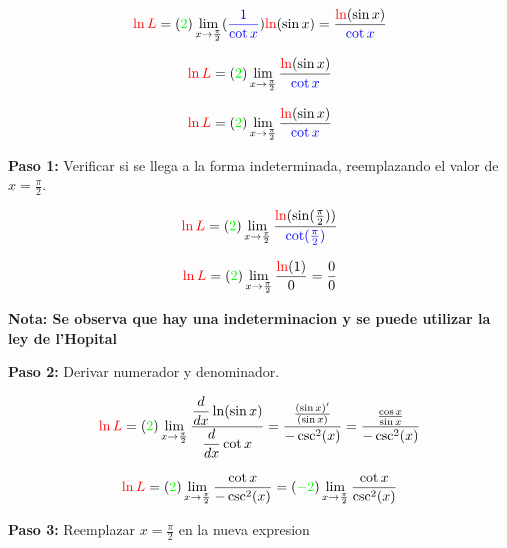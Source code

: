 \documentclass[12pt,a4paper]{article}
\begin{document}
\[
\textcolor{red}{\ln L} = (\textcolor{green}{2})\lim_{x \to  \frac{\pi}{2}} (\textcolor{blue}{\frac{1}{\cot x}}) \textcolor{red}{\ln}(\sin x)= \frac{\textcolor{red}{\ln}(\sin x)}{\textcolor{blue}{\cot x}}
\]

\[
\textcolor{red}{\ln L} = (\textcolor{green}{2})\lim_{x \to  \frac{\pi}{2}}\frac{\textcolor{red}{\ln}(\sin x)}{\textcolor{blue}{\cot x}}
\]




\[
\textcolor{red}{\ln L} = (\textcolor{green}{2})\lim_{x \to  \frac{\pi}{2}}\frac{\textcolor{red}{\ln}(\sin x)}{\textcolor{blue}{\cot x}} 
\]

\vspace{0.2cm}

\textbf{Paso 1:}
\vspace{0.2cm}
Verificar si se llega a la forma indeterminada, reemplazando el valor de $x= \frac{\pi}{2}$.


\[
\textcolor{red}{\ln L} = (\textcolor{green}{2})\lim_{x \to  \frac{\pi}{2}}\frac{\textcolor{red}{\ln}(\sin (\frac{\pi}{2}))}{\textcolor{blue}{\cot (\frac{\pi}{2})}}
\]

\[
\textcolor{red}{\ln L} = (\textcolor{green}{2})\lim_{x \to  \frac{\pi}{2}}\frac{\textcolor{red}{\ln}(1)}{0}= \frac{0}{0}
\]

\vspace{0.2cm}

\textbf{Nota: Se observa que hay una indeterminacion y se puede utilizar la ley de l'Hopital }

\vspace{0.5cm}

\textbf{Paso 2:}
\vspace{0.2cm}
Derivar numerador y denominador.

\[
\textcolor{red}{\ln L} = (\textcolor{green}{2}) \lim_{x \to \frac{\pi}{2}} \frac{\dfrac{d}{dx} \ln (\sin x)}{\dfrac{d}{dx} \cot x}= \frac{\frac{(\sin x)'}{(\sin x)}}{-\csc ^2 (x)}= \frac{\frac{\cos x}{\sin x}}{-\csc^2 (x)}
\]

\[
\textcolor{red}{\ln L} = (\textcolor{green}{2}) \lim_{x \to \frac{\pi}{2}} \frac{\cot x}{-\csc^2 (x)} = (\textcolor{green}{-2}) \lim_{x \to \frac{\pi}{2}} \frac{\cot x}{\csc^2 (x)}
\]
	
\vspace{0.2cm}



\textbf{Paso 3:}
\vspace{0.2cm}
Reemplazar $x=\frac{\pi}{2}$ en la nueva expresion
\end{document}
